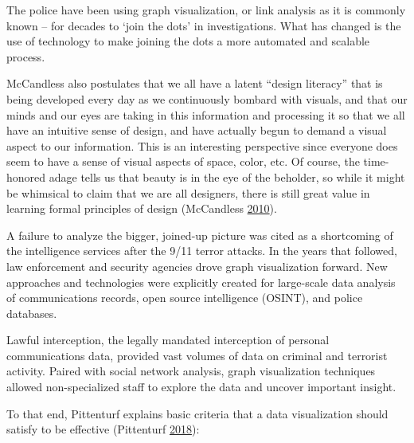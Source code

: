 \documentclass[]{book}
\theoremstyle{definition}
\theoremstyle{definition}
\theoremstyle{definition}
\theoremstyle{remark}
\begin{document}
The police have been using graph visualization, or link analysis as it
is commonly known -- for decades to `join the dots' in investigations.
What has changed is the use of technology to make joining the dots a
more automated and scalable process.

McCandless also postulates that we all have a latent ``design literacy''
that is being developed every day as we continuously bombard with
visuals, and that our minds and our eyes are taking in this information
and processing it so that we all have an intuitive sense of design, and
have actually begun to demand a visual aspect to our information. This
is an interesting perspective since everyone does seem to have a sense
of visual aspects of space, color, etc. Of course, the time-honored
adage tells us that beauty is in the eye of the beholder, so while it
might be whimsical to claim that we are all designers, there is still
great value in learning formal principles of design (McCandless
\protect\hyperlink{ref-viz_ted}{2010}).

A failure to analyze the bigger, joined-up picture was cited as a
shortcoming of the intelligence services after the 9/11 terror attacks.
In the years that followed, law enforcement and security agencies drove
graph visualization forward. New approaches and technologies were
explicitly created for large-scale data analysis of communications
records, open source intelligence (OSINT), and police databases.

Lawful interception, the legally mandated interception of personal
communications data, provided vast volumes of data on criminal and
terrorist activity. Paired with social network analysis, graph
visualization techniques allowed non-specialized staff to explore the
data and uncover important insight.

To that end, Pittenturf explains basic criteria that a data
visualization should satisfy to be effective (Pittenturf
\protect\hyperlink{ref-viz_importance}{2018}):
\end{document}
